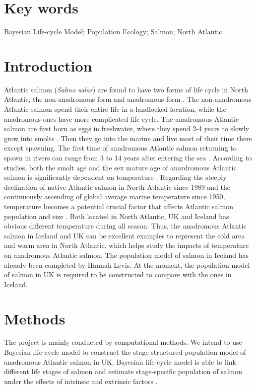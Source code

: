 \documentclass[11pt]{article}
\begin{document}
\newpage
\begin{linenumbers}
\section{Key words}
Bayesian Life-cycle Model; Population Ecology; Salmon; North Atlantic
\section{Introduction}
Atlantic salmon (\textit{Salmo salar}) are found to have two forms of life cycle in North Atlantic, the non-anadromous form and anadromous form \cite{verspoor2007atlantic}. The non-anadromous Atlantic salmon spend their entire life in a landlocked location, while the anadromous ones have more complicated life cycle. The anadromous Atlantic salmon are first born as eggs in freshwater, where they spend 2-4 years to slowly grow into smolts \cite{verspoor2007atlantic}. Then they go into the marine and live most of their time there except spawning. The first time of anadromous Atlantic salmon returning to spawn in rivers can range from 3 to 14 years after entering the sea \cite{chaput2012overview}. According to studies, both the smolt age and the sex mature age of anardromous Atlantic salmon is significantly dependent on temperature \cite{metcalfe1990determinants, scarnecchia1983age}. Regarding the steeply declination of native Atlantic salmon in North Atlantic since 1989 and the continuously ascending of global average marine temperature since 1950, temperature becomes a potential crucial factor that affects Atlantic salmon population and size \cite{parrish1998aren, brohan2006uncertainty}. Both located in North Atlantic, UK and Iceland has obvious different temperature during all season. Thus, the anadromous Atlantic salmon in Iceland and UK can be excellent examples to represent the cold area and warm area in North Atlantic, which helps study the impacts of temperature on anadromous Atlantic salmon. The population model of salmon in Iceland has already been completed by Hannah Levis. At the moment, the population model of salmon in UK is required to be constructed to compare with the ones in Iceland. 

\section{Methods}
The project is mainly conducted by computational methods. We intend to use Bayesian life-cycle model to construct the stage-structured population model of anadromous Atlantic salmon in UK. Bayesian life-cycle model is able to link different life stages of salmon and estimate stage-specific population of salmon under the effects of intrinsic and extrinsic factors \cite{ohlberger2018bayesian}. 


\end{linenumbers}
\end{document}
